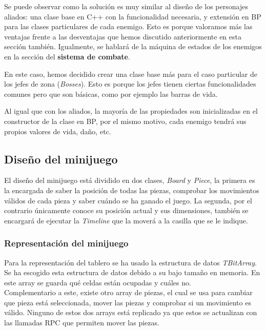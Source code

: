 Se puede observar como la solución es muy similar al diseño de los personajes aliados: una clase base en C++ con la funcionalidad necesaria, y extensión en \ac{BP} para las clases particulares de cada enemigo. Esto es porque valoramos más las ventajas frente a las desventajas que hemos discutido anteriormente en esta sección también. Igualmente, se hablará de la máquina de estados de los enemigos en la sección del \textbf{sistema de combate}.


En este caso, hemos decidido crear una clase base más para el caso particular de los jefes de zona (\textit{Bosses}). Esto es porque los jefes tienen ciertas funcionalidades comunes pero que son básicas, como por ejemplo las barras de vida.


Al igual que con los aliados, la mayoría de las propiedades son inicializadas en el constructor de la clase en \ac{BP}, por el mismo motivo, cada enemigo tendrá sus propios valores de vida, daño, etc.

\subsection{Diseño del minijuego}
El diseño del minijuego está dividido en dos clases, \textit{Board} y \textit{Piece}, la primera es la encargada de saber la posición de todas las piezas, comprobar los movimientos válidos de cada pieza y saber cuándo se ha ganado el juego. La segunda, por el contrario únicamente conoce su posición actual y sus dimensiones, también se encargará de ejecutar la \textit{Timeline} que la moverá a la casilla que se le indique. \\

\subsubsection{Representación del minijuego}
Para la representación del tablero se ha usado la estructura de datos \textit{TBitArray}. Se ha escogido esta estructura de datos debido a su bajo tamaño en memoria. En este array se guarda qué celdas están ocupadas y cuáles no. \\

Complementario a este, existe otro array de piezas, el cual se usa para cambiar que pieza está seleccionada, mover las piezas y comprobar si un movimiento es válido. Ninguno de estos dos arrays está replicado ya que estos se actualizan con las llamadas \ac{RPC} que permiten mover las piezas. \\

